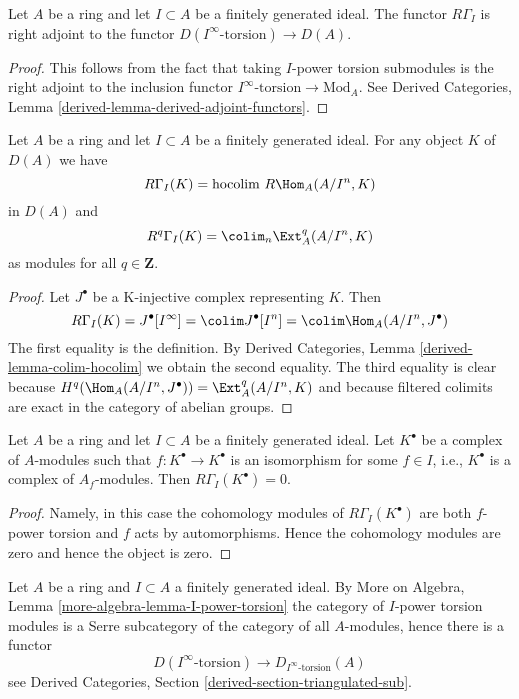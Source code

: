\begin{lemma}
\label{lemma-adjoint}
Let $A$ be a ring and let $I \subset A$ be a finitely generated ideal.
The functor $R\Gamma_I$ is right adjoint to the functor
$D(I^\infty\text{-torsion}) \to D(A)$.
\end{lemma}

\begin{proof}
This follows from the fact that taking $I$-power torsion submodules
is the right adjoint to the inclusion functor
$I^\infty\text{-torsion} \to \text{Mod}_A$. See
Derived Categories, Lemma \ref{derived-lemma-derived-adjoint-functors}.
\end{proof}

\begin{lemma}
\label{lemma-local-cohomology-ext}
Let $A$ be a ring and let $I \subset A$ be a finitely generated ideal.
For any object $K$ of $D(A)$ we have
$$
R\Gamma_I(K) = \text{hocolim}\ R\Hom_A(A/I^n, K)
$$
in $D(A)$ and
$$
R^q\Gamma_I(K) = \colim_n \Ext_A^q(A/I^n, K)
$$
as modules for all $q \in \mathbf{Z}$.
\end{lemma}

\begin{proof}
Let $J^\bullet$ be a K-injective complex representing $K$.
Then
$$
R\Gamma_I(K) = J^\bullet[I^\infty] = \colim J^\bullet[I^n] =
\colim \Hom_A(A/I^n, J^\bullet)
$$
The first equality is the definition.
By Derived Categories, Lemma \ref{derived-lemma-colim-hocolim}
we obtain the second equality. The third equality is clear
because $H^q(\Hom_A(A/I^n, J^\bullet)) = \Ext^q_A(A/I^n, K)$
and because filtered colimits are exact in the category of abelian
groups.
\end{proof}

\begin{lemma}
\label{lemma-bad-local-cohomology-vanishes}
Let $A$ be a ring and let $I \subset A$ be a finitely generated ideal.
Let $K^\bullet$ be a complex of $A$-modules such that
$f : K^\bullet \to K^\bullet$ is an isomorphism for some
$f \in I$, i.e., $K^\bullet$ is a complex of $A_f$-modules. Then
$R\Gamma_I(K^\bullet) = 0$.
\end{lemma}

\begin{proof}
Namely, in this case the cohomology modules of $R\Gamma_I(K^\bullet)$
are both $f$-power torsion and $f$ acts by automorphisms. Hence the
cohomology modules are zero and hence the object is zero.
\end{proof}

\noindent
Let $A$ be a ring and $I \subset A$ a finitely generated ideal.
By More on Algebra, Lemma \ref{more-algebra-lemma-I-power-torsion}
the category of $I$-power torsion modules is a Serre subcategory
of the category of all $A$-modules, hence there is a functor
\begin{equation}
\label{equation-compare-torsion}
D(I^\infty\text{-torsion}) \to D_{I^\infty\text{-torsion}}(A)
\end{equation}
see Derived Categories, Section \ref{derived-section-triangulated-sub}.

